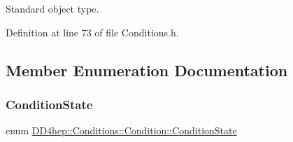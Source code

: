 Standard object type. 



Definition at line 73 of file Conditions.\+h.



\subsection{Member Enumeration Documentation}
\hypertarget{class_d_d4hep_1_1_conditions_1_1_condition_a22825c02029e39fd0aa95c08c9be56d9}{}\label{class_d_d4hep_1_1_conditions_1_1_condition_a22825c02029e39fd0aa95c08c9be56d9} 
\subsubsection{\texorpdfstring{Condition\+State}{ConditionState}}
{\footnotesize\ttfamily enum \hyperlink{class_d_d4hep_1_1_conditions_1_1_condition_a22825c02029e39fd0aa95c08c9be56d9}{D\+D4hep\+::\+Conditions\+::\+Condition\+::\+Condition\+State}}

